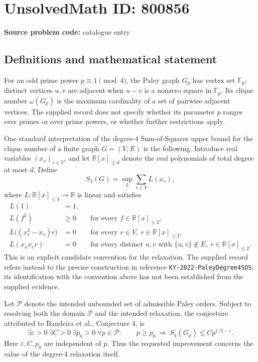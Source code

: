 \documentclass[11pt]{article}
\newcommand{\R}{\mathbb{R}}
\newcommand{\F}{\mathbb{F}}
\begin{document}
\section*{UnsolvedMath ID: 800856}
\textbf{Source problem code:} catalogue entry
\subsection{Definitions and mathematical statement}
For an odd prime power \(p\equiv 1\pmod 4\), the Paley graph \(G_p\) has vertex set \(\F_p\); distinct vertices \(u,v\) are adjacent when \(u-v\) is a nonzero square in \(\F_p\). Its clique number \(\omega(G_p)\) is the maximum cardinality of a set of pairwise adjacent vertices. The supplied record does not specify whether its parameter \(p\) ranges over primes or over prime powers, or whether further restrictions apply.

One standard interpretation of the degree-\(4\) Sum-of-Squares upper bound for the clique number of a finite graph \(G=(V,E)\) is the following. Introduce real variables \((x_v)_{v\in V}\), and let \(\R[x]_{\leq d}\) denote the real polynomials of total degree at most \(d\). Define
\[
S_4(G)=\sup_L\sum_{v\in V}L(x_v),
\]
where \(L:\R[x]_{\leq4}\to\R\) is linear and satisfies
\[
\begin{aligned}
L(1)&=1,\\
L(f^2)&\geq0 &&\text{for every }f\in\R[x]_{\leq2},\\
L\bigl((x_v^2-x_v)r\bigr)&=0
&&\text{for every }v\in V,\ r\in\R[x]_{\leq2},\\
L(x_ux_vr)&=0
&&\text{for every distinct }u,v\text{ with }\{u,v\}\notin E,
\ r\in\R[x]_{\leq2}.
\end{aligned}
\]
This is an explicit candidate convention for the relaxation. The supplied record refers instead to the precise construction in reference \texttt{KY-2022-PaleyDegree4SOS}; its identification with the convention above has not been established from the supplied evidence.

Let \(\mathcal P\) denote the intended unbounded set of admissible Paley orders. Subject to resolving both the domain \(\mathcal P\) and the intended relaxation, the conjecture attributed to Bandeira et al., Conjecture 4, is
\[
\exists\varepsilon>0\ \exists C>0\ \exists p_0>0\ 
\forall p\in\mathcal P:\qquad
p\geq p_0\ \Longrightarrow\ S_4(G_p)\leq C p^{1/2-\varepsilon}.
\]
Here \(\varepsilon,C,p_0\) are independent of \(p\). Thus the requested improvement concerns the value of the degree-\(4\) relaxation itself.
\end{document}
